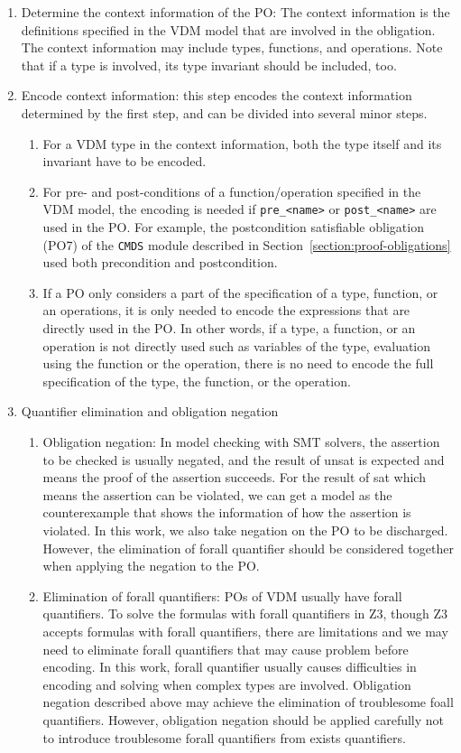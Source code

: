 \begin{enumerate}
\item
Determine the context information of the PO: The context information is the definitions specified in the VDM model that are involved in the obligation. The context information may include types, functions, and operations. Note that if a type is involved, its type invariant should be included, too.
\item
Encode context information: this step encodes the context information determined by the first step, and can be divided into several minor steps.
\begin{enumerate}
\item
For a VDM type in the context information, both the type itself and its invariant have to be encoded.
\item
For pre- and post-conditions of a function/operation specified in the VDM model, the encoding is needed if {\tt pre\_<name>} or {\tt post\_<name>} are used in the PO. For example, the postcondition satisfiable obligation (PO7) of the {\tt CMDS} module described in Section~\ref{section:proof-obligations} used both precondition and postcondition.
\item
If a PO only considers a part of the specification of a type, function, or an operations, it is only needed to encode the expressions that are directly used in the PO. In other words, if a type, a function, or an operation is not directly used such as variables of the type, evaluation using the function or the operation, there is no need to encode the full specification of the type, the function, or the operation.
\end{enumerate}
\item
Quantifier elimination and obligation negation
\begin{enumerate}
\item
Obligation negation: In model checking with SMT solvers, the assertion to be checked is usually negated, and the result of unsat is expected and means the proof of the assertion succeeds. For the result of sat which means the assertion can be violated, we can get a model as the counterexample that shows the information of how the assertion is violated. In this work, we also take negation on the PO to be discharged. However, the elimination of forall quantifier should be considered together when applying the negation to the PO.
\item
Elimination of forall quantifiers: POs of VDM usually have forall quantifiers. To solve the formulas with forall quantifiers in Z3, though Z3 accepts formulas with forall quantifiers, there are limitations and we may need to eliminate forall quantifiers that may cause problem before encoding. In this work, forall quantifier usually causes difficulties in encoding and solving when complex types are involved. Obligation negation described above may achieve the elimination of troublesome foall quantifiers. However, obligation negation should be applied carefully not to introduce troublesome forall quantifiers from exists quantifiers.
\end{enumerate}
\end{enumerate}

